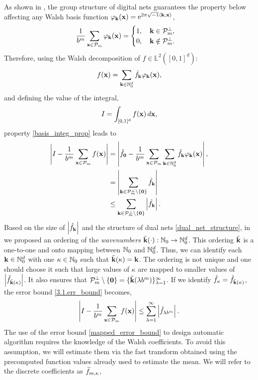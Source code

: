 As shown in \cite[Sec. 3]{HicJim}, the group structure of digital nets guarantees the property below affecting any Walsh basis function $\varphi_{\boldsymbol{\mathbf{k}}}(\boldsymbol{\mathbf{x}})=\text{e}^{2 \pi \sqrt{-1} \left \langle \boldsymbol{\mathbf{k}}, \boldsymbol{\mathbf{x}} \right \rangle_{{}}}$,
\begin{equation}\label{basis_integ_prop}
\frac{1}{b^m}\sum_{\boldsymbol{\mathbf{x}}\in\mathcal{P}_m}\varphi_{\boldsymbol{\mathbf{k}}}(\boldsymbol{\mathbf{x}})=
\begin{cases}
1,\quad \boldsymbol{\mathbf{k}}\in\mathcal{P}_m^\perp, \\
0,\quad \boldsymbol{\mathbf{k}}\notin\mathcal{P}_m^\perp.
\end{cases}
\end{equation}
Therefore, using the Walsh decomposition of $f\in \mathbb{L}^2([0,1]^d)$: \[
f(\boldsymbol{\mathbf{x}})=\sum_{\boldsymbol{\mathbf{k}}\in\mathbb{N}_0^d}\hat{f}_{\boldsymbol{\mathbf{k}}}\varphi_{\boldsymbol{\mathbf{k}}}(\boldsymbol{\mathbf{x}}), \]
and defining the value of the integral,
\[ I = \int_{[0,1]^d} f(\boldsymbol{\mathbf{x}})\,d\boldsymbol{\mathbf{x}},\]
property \eqref{basis_integ_prop} leads to
\begin{align}
\nonumber
\left\lvert I - \frac{1}{b^m}\sum_{\boldsymbol{\mathbf{x}}\in\mathcal{P}_m}f(\boldsymbol{\mathbf{x}})\right\rvert &=
\left\lvert\hat{f}_{\boldsymbol{\mathbf{0}}} - \frac{1}{b^m}\sum_{\boldsymbol{\mathbf{x}}\in\mathcal{P}_m}\sum_{\boldsymbol{\mathbf{k}}\in\mathbb{N}_0^d}\hat{f}_{\boldsymbol{\mathbf{k}}}\varphi_{\boldsymbol{\mathbf{k}}}(\boldsymbol{\mathbf{x}})\right\rvert, \\
\nonumber
&= \left\lvert\sum_{\boldsymbol{\mathbf{k}}\in\mathcal{P}_m^\perp\setminus\{\boldsymbol{\mathbf{0}}\}}\hat{f}_{\boldsymbol{\mathbf{k}}}\right\rvert \\
& \leq \sum_{\boldsymbol{\mathbf{k}}\in\mathcal{P}_m^\perp\setminus\{\boldsymbol{\mathbf{0}}\}}\left\lvert\hat{f}_{\boldsymbol{\mathbf{k}}}\right\rvert. \label{3.1.err_bound}
\end{align}
Based on the size of $\left\lvert\hat{f}_{\boldsymbol{\mathbf{k}}}\right\rvert$ and the structure of dual nets \eqref{dual_net_structure}, in \cite[Sec. 4.1]{HicJim} we proposed an ordering of the \emph{wavenumbers} $\tilde{\boldsymbol{\mathbf{k}}}(\cdot):\mathbb{N}_0\rightarrow\mathbb{N}_0^d$. This ordering $\tilde{\boldsymbol{\mathbf{k}}}$ is a one-to-one and onto mapping between $\mathbb{N}_0$ and $\mathbb{N}_0^d$. Thus, we can identify each $\boldsymbol{\mathbf{k}}\in\mathbb{N}_0^d$ with one $\kappa\in\mathbb{N}_0$ such that $\tilde{\boldsymbol{\mathbf{k}}}(\kappa)=\boldsymbol{\mathbf{k}}$. The ordering is not unique and one should choose it such that large values of $\kappa$ are mapped to smaller values of $\left\lvert\hat{f}_{\tilde{\boldsymbol{\mathbf{k}}}(\kappa)}\right\rvert$. It also ensures that $\mathcal{P}_m^\perp\setminus\{\boldsymbol{\mathbf{0}}\}=\{\tilde{\boldsymbol{\mathbf{k}}}(\lambda b^m)\}_{\lambda=1}^\infty$. If we identify $\hat{f}_{\kappa}=\hat{f}_{\tilde{\boldsymbol{\mathbf{k}}}(\kappa)}$, the error bound \eqref{3.1.err_bound} becomes,
\begin{equation}\label{mapped_error_bound}
\left\lvert I - \frac{1}{b^m}\sum_{\boldsymbol{\mathbf{x}}\in\mathcal{P}_m}f(\boldsymbol{\mathbf{x}})\right\rvert \le \sum_{\lambda=1}^{\infty} \left \lvert \hat{f}_{\lambda b^m}\right \rvert.
\end{equation}
The use of the error bound \eqref{mapped_error_bound} to design  automatic algorithm requires the knowledge of the Walsh coefficients. To avoid this assumption, we will estimate them via the fast transform obtained using the precomputed function values already used to estimate the mean. We will refer to the discrete coefficients as $\widetilde{f}_{m,\kappa}$,
